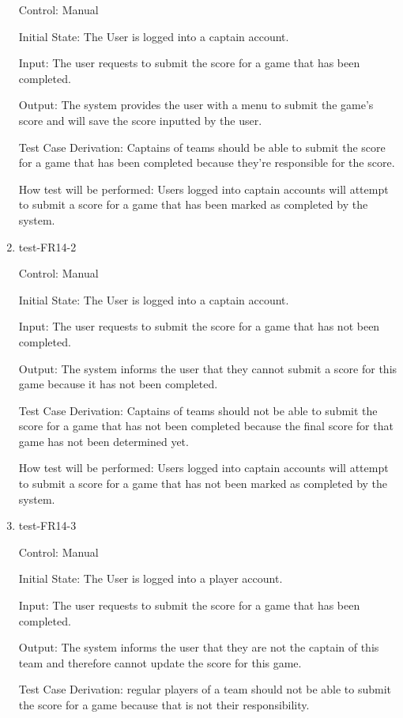 \documentclass[12pt, titlepage]{article}
\begin{document}
\begin{enumerate}
  Control: Manual

  Initial State: The User is logged into a captain account.

  Input: The user requests to submit the score for a game that has been
  completed.

  Output: The system provides the user with a menu to submit the game's
  score and will save the score inputted by the user.

  Test Case Derivation: Captains of teams should be able to submit the score
  for a game that has been completed because they're responsible for the
  score.

  How test will be performed: Users logged into captain accounts will attempt
  to submit a score for a game that has been marked as completed by the system.

  \item{test-FR14-2\\}

  Control: Manual

  Initial State: The User is logged into a captain account.

  Input: The user requests to submit the score for a game that has not
  been completed.

  Output: The system informs the user that they cannot submit a score
  for this game because it has not been completed.

  Test Case Derivation: Captains of teams should not be able to 
  submit the score for a game that has not been completed because 
  the final score for that game has not been determined yet.

  How test will be performed: Users logged into captain accounts will attempt
  to submit a score for a game that has not been marked as completed by 
  the system.

  \item{test-FR14-3\\}

  Control: Manual

  Initial State: The User is logged into a player account.

  Input: The user requests to submit the score for a game that has
  been completed.

  Output: The system informs the user that they are not the captain 
  of this team and therefore cannot update the score for this game.

  Test Case Derivation: regular players of a team should not be able to 
  submit the score for a game because that is not their responsibility.


\end{enumerate}
\end{document}
